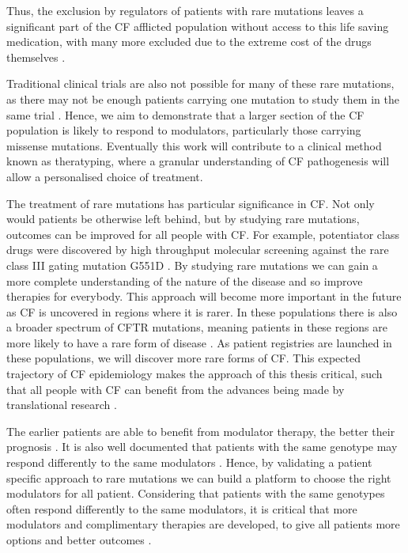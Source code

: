 Thus, the exclusion by regulators of patients with rare mutations leaves a significant part of the CF afflicted population without access to this life saving medication, with many more excluded due to the extreme cost of the drugs themselves \cite{administration2021, trikafta_website, abdallah2021, guo2022a}. 

Traditional clinical trials are also not possible for many of these rare mutations, as there may not be enough patients carrying one mutation to study them in the same trial \cite{grody2007}. Hence, we aim to demonstrate that a larger section of the CF population is likely to respond to modulators, particularly those carrying missense mutations. Eventually this work will contribute to a clinical method known as theratyping, where a granular understanding of CF pathogenesis will allow a personalised choice of treatment.

The treatment of rare mutations has particular significance in CF. Not only would patients be otherwise left behind, but by studying rare mutations, outcomes can be improved for all people with CF. For example, potentiator class drugs were discovered by high throughput molecular screening against the rare class III gating mutation G551D \cite{vangoor2009}. By studying rare mutations we can gain a more complete understanding of the nature of the disease and so improve therapies for everybody. This approach will become more important in the future as CF is uncovered in regions where it is rarer. In these populations there is also a broader spectrum of CFTR mutations, meaning patients in these regions are more likely to have a rare form of disease \cite{singh2015,zheng2017,ni2022}. As patient registries are launched in these populations, we will discover more rare forms of CF. This expected trajectory of CF epidemiology makes the approach of this thesis critical, such that all people with CF can benefit from the advances being made by translational research \cite{zheng2017, garcia2022}. 



The earlier patients are able to benefit from modulator therapy, the better their prognosis \cite{lahiri2022}. It is also well documented that patients with the same genotype may respond differently to the same modulators \cite{hanafin2021}. Hence, by validating a patient specific approach to rare mutations we can build a platform to choose the right modulators for all patient. Considering that patients with the same genotypes often respond differently to the same modulators, it is critical that more modulators and complimentary therapies are developed, to give all patients more options and better outcomes \cite{hanafin2021}.

